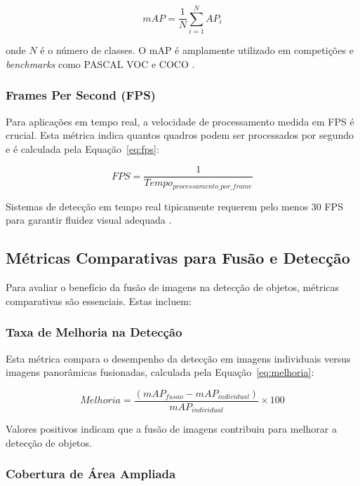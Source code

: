 \begin{equation}
\label{eq:map}
mAP = \frac{1}{N} \sum_{i=1}^{N} AP_i
\end{equation}

\noindent onde $N$ é o número de classes. O mAP é amplamente utilizado em competições e \textit{benchmarks} como PASCAL VOC e COCO \cite{lin2014microsoft}.

\subsubsection{Frames Per Second (FPS)}

Para aplicações em tempo real, a velocidade de processamento medida em FPS é crucial. Esta métrica indica quantos quadros podem ser processados por segundo e é calculada pela Equação~\ref{eq:fps}:

\begin{equation}
\label{eq:fps}
FPS = \frac{1}{Tempo_{processamento\_por\_frame}}
\end{equation}

Sistemas de detecção em tempo real tipicamente requerem pelo menos 30 FPS para garantir fluidez visual adequada \cite{redmon2016you}.

\subsection{Métricas Comparativas para Fusão e Detecção}

Para avaliar o benefício da fusão de imagens na detecção de objetos, métricas comparativas são essenciais. Estas incluem:

\subsubsection{Taxa de Melhoria na Detecção}

Esta métrica compara o desempenho da detecção em imagens individuais versus imagens panorâmicas fusionadas, calculada pela Equação~\ref{eq:melhoria}:

\begin{equation}
\label{eq:melhoria}
Melhoria = \frac{(mAP_{fusao} - mAP_{individual})}{mAP_{individual}} \times 100
\end{equation}

Valores positivos indicam que a fusão de imagens contribuiu para melhorar a detecção de objetos.

\subsubsection{Cobertura de Área Ampliada}

